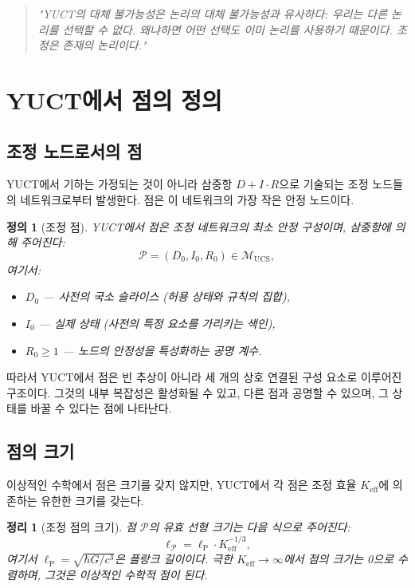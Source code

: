 \documentclass[12pt,a4paper]{article}
\newtheorem{theorem}{정리}
\newtheorem{definition}{정의}
\newcommand{\Keff}{K_{\mathrm{eff}}}
\newcommand{\calP}{\mathcal{P}}
\newcommand{\ellP}{\ell_{\mathrm{P}}}
\begin{document}
	\begin{quote}
		\itshape
		"YUCT의 대체 불가능성은 논리의 대체 불가능성과 유사하다: 우리는 다른 논리를 선택할 수 없다. 왜냐하면 어떤 선택도 이미 논리를 사용하기 때문이다. 조정은 존재의 논리이다."
	\end{quote}
	
	\section{YUCT에서 점의 정의}
	
	\subsection{조정 노드로서의 점}
	
	YUCT에서 기하는 가정되는 것이 아니라 삼중항 \(D+I\cdot R\)으로 기술되는 조정 노드들의 네트워크로부터 발생한다. 점은 이 네트워크의 가장 작은 안정 노드이다.
	
	\begin{definition}[조정 점]
		YUCT에서 점은 조정 네트워크의 최소 안정 구성이며, 삼중항에 의해 주어진다:
		\[
		\calP = (D_0, I_0, R_0) \in \mathcal{M}_{\mathrm{UCS}},
		\]
		여기서:
		\begin{itemize}
			\item \(D_0\) — 사전의 국소 슬라이스 (허용 상태와 규칙의 집합),
			\item \(I_0\) — 실제 상태 (사전의 특정 요소를 가리키는 색인),
			\item \(R_0 \ge 1\) — 노드의 안정성을 특성화하는 공명 계수.
		\end{itemize}
	\end{definition}
	
	따라서 YUCT에서 점은 빈 추상이 아니라 세 개의 상호 연결된 구성 요소로 이루어진 구조이다. 그것의 내부 복잡성은 활성화될 수 있고, 다른 점과 공명할 수 있으며, 그 상태를 바꿀 수 있다는 점에 나타난다.
	
	\subsection{점의 크기}
	
	이상적인 수학에서 점은 크기를 갖지 않지만, YUCT에서 각 점은 조정 효율 \(\Keff\)에 의존하는 유한한 크기를 갖는다.
	
	\begin{theorem}[조정 점의 크기]
		점 \(\calP\)의 유효 선형 크기는 다음 식으로 주어진다:
		\[
		\ell_{\calP} = \ellP \cdot \Keff^{-1/3},
		\]
		여기서 \(\ellP = \sqrt{\hbar G / c^3}\)은 플랑크 길이이다.
		극한 \(\Keff \to \infty\)에서 점의 크기는 0으로 수렴하며, 그것은 이상적인 수학적 점이 된다.
	\end{theorem}
	
\end{document}
